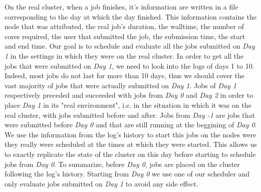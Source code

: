 \documentclass[conference,10pt]{IEEEtran}
\begin{document}
\begin{figure}[tb]
{
}
\caption{}\label{fig.workload}
\label{fig.ex}
\end{figure}

On the real cluster, when a job finishes, it's information
are written in a file corresponding to the day at which the day finished.
This information contains the node that was attributed, the real job's duration, the walltime, 
the number of cores required, the user that submitted the job, the submission time, 
the start and end time.
Our goal is to schedule and evaluate all the jobs submitted on 
\textit{Day 1} in the settings in which they were on the real cluster.
In order to get all the jobs that were submitted on \textit{Day 1}, we need to
look into the logs of days 1 to 10. Indeed, most jobs do not last for more than 10 days,
thus we should cover the vast majority of jobs that were actually submitted on 
\textit{Day 1}. 
Jobs of \textit{Day 1} respectively preceded and succeeded with jobs from \textit{Day 0}
and \textit{Day 2} in order to place \textit{Day 1} in its "real environment",
i.e. in the situation in which it was on the real cluster, with jobs submitted
before and after.
Jobs from \textit{Day -1} are jobs that were submitted before \textit{Day 0} and that are still running at the beggining of \textit{Day 0}.
We use the information from the log's history to start this jobs on the nodes
were they really were scheduled at the times at which they were started.
This allows us to exactly replicate the state of the cluster on this day before starting
to schedule jobs from \textit{Day 0}.
To summarize, before \textit{Day 0}, jobs are placed on the cluster
following the log's history. Starting from \textit{Day 0} we 
use one of our scheduler and only evaluate jobs submitted on \textit{Day 1}
to avoid any side effect.
\end{document}
